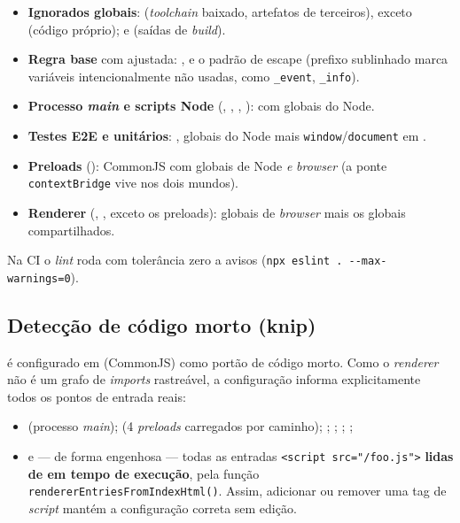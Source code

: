 \begin{itemize}[nosep]
  \item \textbf{Ignorados globais}:  (\emph{toolchain}
        baixado, artefatos de terceiros), exceto 
        (código próprio);  e  (saídas de \emph{build}).
  \item \textbf{Regra base}  com 
        ajustada: ,  e o padrão de
        escape  (prefixo
        sublinhado marca variáveis intencionalmente não usadas, como
        \lstinline|_event|, \lstinline|_info|).
  \item \textbf{Processo \emph{main} e scripts Node} (,
        , , ):
         com globais do Node.
  \item \textbf{Testes E2E e unitários}: , globais do
        Node mais \lstinline|window|/\lstinline|document| em .
  \item \textbf{Preloads} (): CommonJS com globais de
        Node \emph{e} \emph{browser} (a ponte \lstinline|contextBridge| vive nos
        dois mundos).
  \item \textbf{Renderer} (, , exceto os preloads):
        globais de \emph{browser} mais os globais compartilhados.
\end{itemize}

Na CI o \emph{lint} roda com tolerância zero a avisos
(\lstinline|npx eslint . --max-warnings=0|).

\subsection{Detecção de código morto (knip)}
\label{sub:18-knip}

 é configurado em  (CommonJS) como portão de
código morto. Como o \emph{renderer} não é um grafo de \emph{imports}
rastreável, a configuração informa explicitamente todos os pontos de entrada
reais:

\begin{itemize}[nosep]
  \item {} (processo \emph{main});  (4
        \emph{preloads} carregados por caminho); ;
        ;
        ; ;
  \item e --- de forma engenhosa --- todas as entradas
        \lstinline|<script src="/foo.js">| \textbf{lidas de
         em tempo de execução}, pela função
        \lstinline|rendererEntriesFromIndexHtml()|. Assim, adicionar ou remover
        uma tag de \emph{script} mantém a configuração correta sem edição.
\end{itemize}


